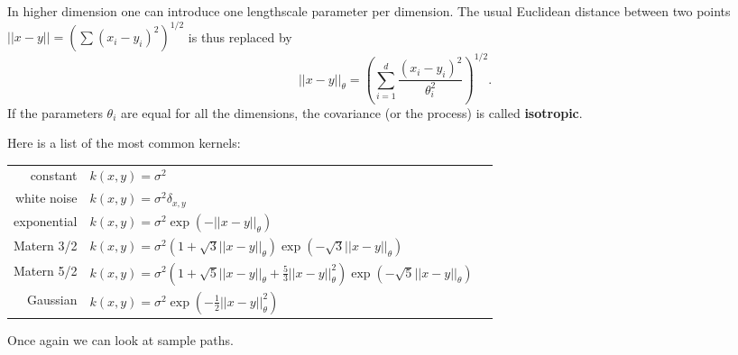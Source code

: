 \documentclass{beamer}
\newcommand\Ni[2]{{|| #1 ||}_{\! #2}}
\begin{document}
\begin{frame}{}
In higher dimension one can introduce one lengthscale parameter per dimension. The usual Euclidean distance between two points $|| x-y || = ( \sum (x_i-y_i)^2)^{1/2}$ is thus replaced by
\begin{equation*}
	\Ni{x-y}{\theta} = \left( \sum_{i=1}^d \frac{(x_i-y_i)^2}{\theta_i^2} \right)^{1/2}.
\end{equation*}
If the parameters $\theta_i$ are equal for all the dimensions, the covariance (or the process) is called \textbf{isotropic}.
\end{frame}

\begin{frame}{}
Here is a list of the most common kernels:\\
\vspace{2mm}
\footnotesize
\centering
\begin{tabular}{rlN}
		constant & $ \displaystyle k(x,y) = \sigma^2 $ &\\[4mm]
		white noise & $ \displaystyle k(x,y) = \sigma^2 \delta_{x,y} $ &\\[4mm]
		exponential & $\displaystyle k(x,y) = \sigma^2 \exp \left(- \Ni{x-y}{\theta} \right)$ &\\[4mm]
		Matern 3/2 & $\displaystyle k(x,y) = \sigma^2 \left(1 + \sqrt{3}\Ni{x-y}{\theta} \right) \exp \left(- \sqrt{3}\Ni{x-y}{\theta}  \right)$ &\\[4mm]
		Matern 5/2 & $\displaystyle k(x,y) = \sigma^2 \left(1 + \sqrt{5}\Ni{x-y}{\theta} + \frac{5}{3}\Ni{x-y}{\theta}^2 \right) \exp \left(- \sqrt{5}\Ni{x-y}{\theta} \right)$ &\\[4mm]
		Gaussian & $\displaystyle k(x,y) = \sigma^2 \exp \left(- \frac12 \Ni{x-y}{\theta}^2 \right)$ &\\[4mm]
\end{tabular}
Once again we can look at sample paths.
\end{frame}

\end{document}
